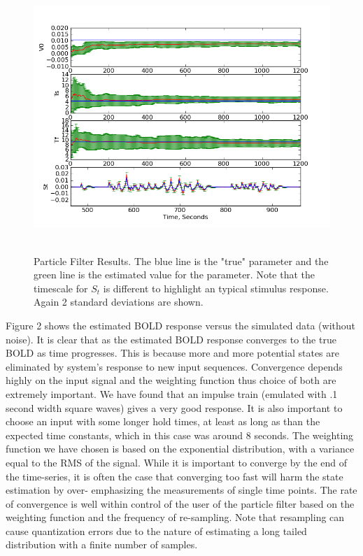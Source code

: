 \documentclass{article}
\begin{document}
\begin{figure}
\includegraphics[width=8in,height=4in]{state.png}
\caption{Particle Filter Results. The blue line is the "true"
parameter and the green line is the estimated value for the parameter.
Note that the timescale for $S_t$ is different to highlight an typical
stimulus response. Again 2 standard deviations are shown.}
\label{fig:state}
\end{figure}

Figure 2 shows the estimated BOLD response versus the simulated
data (without noise). It is clear that as the estimated BOLD
response converges to the true BOLD as time progresses. This
is because more and more potential states are eliminated by system's
response to new input sequences. Convergence depends highly on 
the input signal and the weighting function thus choice of both
are extremely important. We have found that an impulse train
(emulated with .1 second width square waves) gives a very good
response. It is also important to choose an input with
some longer hold times, at least as long as than the 
expected time constants, which in this case was around 
8 seconds. The weighting function we have chosen is based
on the exponential distribution, with a variance equal to
the RMS of the signal. While it is important to converge
by the end of the time-series, it is often the case that 
converging too fast will harm the state estimation by over-
emphasizing the measurements of single time points. The rate
of convergence is well within control of the user of the 
particle filter based on the weighting function and the frequency
of re-sampling. Note that resampling can cause quantization
errors due to the nature of estimating a long tailed 
distribution with a finite number of samples. 
\end{document}
